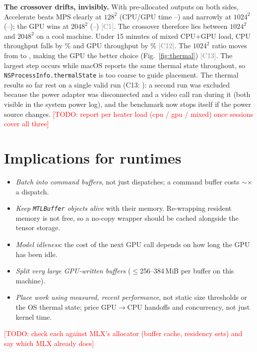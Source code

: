 \documentclass[conference,10pt]{IEEEtran}
\newcommand{\todo}[1]{\textcolor{red}{[TODO: #1]}}
\newcommand{\claim}[1]{\textcolor{gray}{\scriptsize[#1]}}
\newcommand{\todo}[1]{}
\newcommand{\claim}[1]{}
\begin{document}
\textbf{The crossover drifts, invisibly.} With pre-allocated outputs on both sides, Accelerate beats MPS clearly at
$128^2$ (CPU/GPU time \CrossRatioSmallMin{}--\CrossRatioSmallMax{}) and narrowly at $1024^2$
(\CrossRatioOneKMin{}--\CrossRatioOneKMax{}); the GPU wins at $2048^2$ (\CrossRatioTwoKMin{}--\CrossRatioTwoKMax{})
\claim{C1}. The crossover therefore lies between $1024^2$ and $2048^2$ on a cool machine. Under 15 minutes of mixed CPU+GPU load, CPU throughput falls by \ThermalCpuLossPct{}\%
and GPU throughput by \ThermalGpuLossPct{}\% \claim{C12}. The $1024^2$ ratio moves from \DriftRatioStart{} to
\DriftRatioEnd{}, making the GPU the better choice (Fig.~\ref{fig:thermal}) \claim{C13}. The largest step occurs
while macOS reports the same thermal state throughout, so \texttt{NSProcessInfo.thermalState} is too coarse to
guide placement. The thermal results so far rest on a single valid run (C13: ): a second run was excluded because the
power adapter was disconnected and a video call ran during it (both visible in the system power log), and the
benchmark now stops itself if the power source changes. \todo{report per heater load (cpu / gpu / mixed) once
sessions cover all three}

\section{Implications for runtimes}

\begin{itemize}
  \item \emph{Batch into command buffers}, not just dispatches; a command buffer costs ${\sim}$\CbOverDispatch{}$\times$ a dispatch.
  \item \emph{Keep \texttt{MTLBuffer} objects alive} with their memory. Re-wrapping resident memory is not free, so a no-copy
        wrapper should be cached alongside the tensor storage.
  \item \emph{Model idleness}: the cost of the next GPU call depends on how long the GPU has been idle.
  \item \emph{Split very large GPU-written buffers} (${\leq}$256--384\,MiB per buffer on this machine).
  \item \emph{Place work using measured, recent performance}, not static size thresholds or the OS thermal state;
        price GPU$\rightarrow$CPU handoffs and concurrency, not just kernel time.
\end{itemize}
\todo{check each against MLX's allocator (buffer cache, residency sets) and say which MLX already does}
\end{document}
